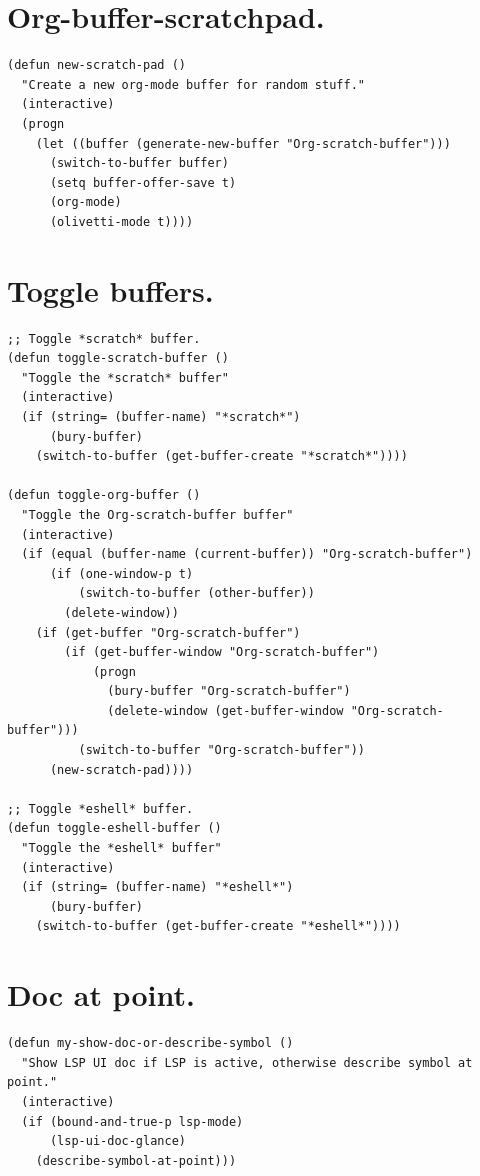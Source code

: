 \documentclass[11pt]{article}
\begin{document}
\section{Org-buffer-scratchpad.}
\label{sec:org415cfb8}
\begin{verbatim}
(defun new-scratch-pad ()
  "Create a new org-mode buffer for random stuff."
  (interactive)
  (progn
    (let ((buffer (generate-new-buffer "Org-scratch-buffer")))
      (switch-to-buffer buffer)
      (setq buffer-offer-save t)
      (org-mode)
      (olivetti-mode t))))
\end{verbatim}
\section{Toggle buffers.}
\label{sec:org70ce57a}
\begin{verbatim}
;; Toggle *scratch* buffer.
(defun toggle-scratch-buffer ()
  "Toggle the *scratch* buffer"
  (interactive)
  (if (string= (buffer-name) "*scratch*")
      (bury-buffer)
    (switch-to-buffer (get-buffer-create "*scratch*"))))

(defun toggle-org-buffer ()
  "Toggle the Org-scratch-buffer buffer"
  (interactive)
  (if (equal (buffer-name (current-buffer)) "Org-scratch-buffer")
      (if (one-window-p t)
          (switch-to-buffer (other-buffer))
        (delete-window))
    (if (get-buffer "Org-scratch-buffer")
        (if (get-buffer-window "Org-scratch-buffer")
            (progn
              (bury-buffer "Org-scratch-buffer")
              (delete-window (get-buffer-window "Org-scratch-buffer")))
          (switch-to-buffer "Org-scratch-buffer"))
      (new-scratch-pad))))

;; Toggle *eshell* buffer.
(defun toggle-eshell-buffer ()
  "Toggle the *eshell* buffer"
  (interactive)
  (if (string= (buffer-name) "*eshell*")
      (bury-buffer)
    (switch-to-buffer (get-buffer-create "*eshell*"))))
\end{verbatim}
\section{Doc at point.}
\label{sec:org093de8d}
\begin{verbatim}
(defun my-show-doc-or-describe-symbol ()
  "Show LSP UI doc if LSP is active, otherwise describe symbol at point."
  (interactive)
  (if (bound-and-true-p lsp-mode)
      (lsp-ui-doc-glance)
    (describe-symbol-at-point)))
\end{verbatim}
\end{document}
